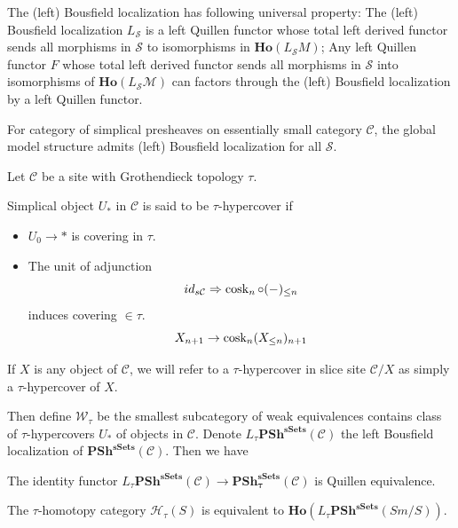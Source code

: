 \documentclass[b5paper,10pt]{article}
\begin{document}
The (left) Bousfield localization has following universal property: The (left) Bousfield localization $L_{\mathcal{S}}$ is a left Quillen functor whose total left derived functor sends all morphisms in $\mathcal{S}$ to isomorphisms in $\mathbf{Ho}(L_\mathcal{S}M)$; Any left Quillen functor $F$ whose total left derived functor sends all morphisms in $\mathcal{S}$ into isomorphisms of $\mathbf{Ho}(L_\mathcal{S}\mathcal{M})$ can factors through the (left) Bousfield localization by a left Quillen functor.
\begin{secthm}
	For category of simplical presheaves on essentially small category $\mathcal{C}$, the global model structure admits (left) Bousfield localization for all $\mathcal{S}$.
\end{secthm}
Let $\mathcal{C}$ be a site with Grothendieck topology $\tau$. 
\begin{secdefn}
	Simplical object $U_*$ in $\mathcal{C}$ is said to be $\tau$-hypercover if 
	\begin{itemize}
		\item $U_0 \to *$ is covering in $\tau$.
		\item  The unit of adjunction
		\[
		id_{s\mathcal{C}} \Rightarrow \operatorname{cosk}_n \circ (-)_{\leq n}
		\]
		induces covering $\in \tau$.
		\[
		X_{n+1} \to 
		\operatorname{cosk}_n(X_{\leq n})_{n+1}
		\]
	\end{itemize}
If $X$ is any object of $\mathcal{C}$, we will refer to a $\tau$-hypercover in slice site $\mathcal{C}/X$ as simply a $\tau$-hypercover of $X$.
\end{secdefn}

Then define $\mathcal{W}_\tau$ be the smallest subcategory of weak equivalences contains class of $\tau$-hypercovers $U_*$ of objects in $\mathcal{C}$. Denote $L_\tau \mathbf{PSh^{sSets}}(\mathcal{C})$ the left Bousfield localization of $\mathbf{PSh^{sSets}}(\mathcal{C})$. Then we have
\begin{secthm}
	The identity functor $L_{\tau} \mathbf{PSh^{sSets}}(\mathcal{C}) \to \mathbf{PSh^{sSets}_\tau}(\mathcal{C})$ is Quillen equivalence.
\end{secthm}
\begin{seccor}
	The $\tau$-homotopy category $\mathcal{H}_\tau(S)$ is equivalent to $\mathbf{Ho}(L_\tau \mathbf{PSh^{sSets}}(Sm/S))$.
\end{seccor}
\end{document}
